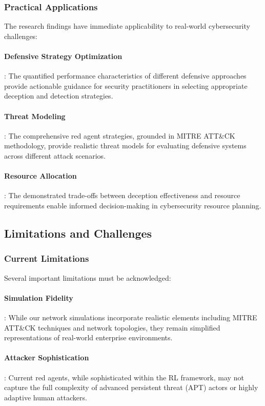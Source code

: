 \documentclass[12pt,oneside]{article}
\begin{document}
\subsubsection{Practical Applications}
The research findings have immediate applicability to real-world cybersecurity challenges:

\paragraph{Defensive Strategy Optimization}: The quantified performance characteristics of different defensive approaches provide actionable guidance for security practitioners in selecting appropriate deception and detection strategies.

\paragraph{Threat Modeling}: The comprehensive red agent strategies, grounded in MITRE ATT\&CK methodology, provide realistic threat models for evaluating defensive systems across different attack scenarios.

\paragraph{Resource Allocation}: The demonstrated trade-offs between deception effectiveness and resource requirements enable informed decision-making in cybersecurity resource planning.

\subsection{Limitations and Challenges}

\subsubsection{Current Limitations}
Several important limitations must be acknowledged:

\paragraph{Simulation Fidelity}: While our network simulations incorporate realistic elements including MITRE ATT\&CK techniques and network topologies, they remain simplified representations of real-world enterprise environments.

\paragraph{Attacker Sophistication}: Current red agents, while sophisticated within the RL framework, may not capture the full complexity of advanced persistent threat (APT) actors or highly adaptive human attackers.
\end{document}

